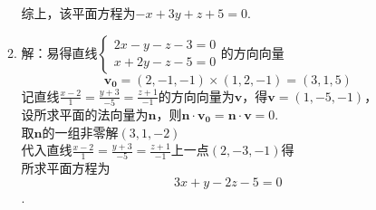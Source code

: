 \documentclass[UTF8]{ctexart}
\begin{document}
\begin{enumerate}
\begin{enumerate}[(1)]
综上，该平面方程为$-x+3y+z+5=0.$
\item 解：易得直线$\left\{\begin{array}{l}2x-y-z-3=0\\x+2y-z-5=0\end{array}\right.$的方向向量$$\mathbf{v_0}=\left(2,-1,-1\right)\times\left(1,2,-1\right)=\left(3,1,5\right)$$记直线$\displaystyle\frac{x-2}{1}=\displaystyle\frac{y+3}{-5}=\displaystyle\frac{z+1}{-1}$的方向向量为$\mathbf{v}$，得$\mathbf{v}=\left(1,-5,-1\right)$，\\
设所求平面的法向量为$\mathbf{n}$，则$\mathbf{n}\cdot\mathbf{v_0}=\mathbf{n}\cdot\mathbf{v}=0.$\\
取$\mathbf{n}$的一组非零解$\left(3,1,-2\right)$\\
代入直线$\displaystyle\frac{x-2}{1}=\displaystyle\frac{y+3}{-5}=\displaystyle\frac{z+1}{-1}$上一点$\left(2,-3,-1\right)$得\\所求平面方程为$$3x+y-2z-5=0$$.
\end{enumerate}
\end{enumerate}
\end{document}
